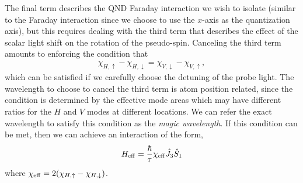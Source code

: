 \documentclass[preprint,aps,pra,onecolumn]{revtex4-1} %
\begin{document}
The final term describes the QND Faraday interaction we wish to isolate (similar to the Faraday interaction since we choose to use the $ x $-axis as the quantization axis), but this requires dealing with the third term that describes the effect of the scalar light shift on the rotation of the pseudo-spin.  Canceling the third term amounts to enforcing the condition that
\begin{align}
	\chi_{H,\uparrow} - \chi_{H,\downarrow} = \chi_{V,\downarrow} - \chi_{V,\uparrow} ,
\end{align}
which can be satisfied if we carefully choose the detuning of the probe light. The wavelength to choose to cancel the third term is atom position related, since the condition is determined by the effective mode areas which may have different ratios for the $ H $ and $ V $ modes at different locations. We can refer the exact wavelength to satisfy this condition as the \textit{magic wavelength}. If this condition can be met, then we can achieve an interaction of the form,
\begin{align}
	H_{\rm eff} = \frac{\hbar}{\tau} \chi_{\rm eff} \hat{J}_3 \hat{S}_1
\end{align}
where $\chi_{\rm eff} = 2(\chi_{H,\uparrow} - \chi_{H,\downarrow})$.  
\end{document}
